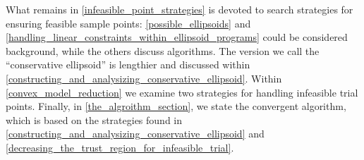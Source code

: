 \documentclass{article}
\theoremstyle{case}
\numberwithin{theorem}{subsection}
\newcommand{\dk}{\Delta_k}
\newcommand{\feasible}{{\mathcal F}}
\newcommand{\outertrk}{{T_{\text{out}}^{(k)}}}
\newcommand{\sampletrk}{{T_{\text{interp}}^{(k)}}}
\newcommand{\replace}[2]{{\color{red}\sout{#1}\color{black}{\color{red}#2\color{black}}}} %
\newcommand{\sbnote}[1]{\textsf{{\color{cyan}{ SCB note:}   #1} }\marginpar{{\textbf{Comment}}}}
\begin{document}



What remains in \cref{infeasible_point_strategies} is devoted to search strategies for ensuring feasible sample points:
\cref{possible_ellipsoids} and \cref{handling_linear_constraints_within_ellipsoid_programs} could be considered background, while the others discuss algorithms.
The version we call the ``conservative ellipsoid'' is lengthier and discussed within \cref{constructing_and_analysizing_conservative_ellipsoid}.
Within \cref{convex_model_reduction} we examine two strategies for handling infeasible trial points.
Finally, in \cref{the_algroithm_section}, we state the convergent algorithm, which is based on the strategies found in 
\cref{constructing_and_analysizing_conservative_ellipsoid} and \cref{decreasing_the_trust_region_for_infeasible_trial}.






% 
% 
% 
% 
% 
% 
\end{document}
